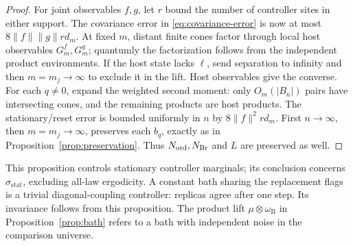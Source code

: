 \begin{proof}
For joint observables \(f,g\), let \(r\) bound the number of
controller sites in either support. The covariance error in
\eqref{eq:covariance-error} is now at most
\(8\|f\|\|g\|r d_m\). At fixed \(m\), distant finite cones
factor through local host observables \(G_m^f,G_m^g\);
quantumly the factorization follows from the independent
product environments. If the host state lacks \(\ell\), send
separation to infinity and then \(m=m_j\to\infty\) to exclude
it in the lift. Host observables give the converse.
For each \(q\ne0\), expand the weighted second moment:
only \(O_m(|B_n|)\) pairs have intersecting cones, and the
remaining products are host products. The stationary/reset
error is bounded uniformly in \(n\) by \(8\|f\|^2r d_m\).
First \(n\to\infty\), then \(m=m_j\to\infty\), preserves
each \(b_q\), exactly as in Proposition~\ref{prop:preservation}.
Thus \(N_{\mathrm{ord}},N_{\mathrm{Br}}\) and \(L\) are preserved as well.
\end{proof}

This proposition controls stationary controller marginals; its
conclusion concerns \(\sigma_{\mathrm{stat}}\), excluding
all-law ergodicity. A constant bath sharing the replacement
flags is a trivial diagonal-coupling controller: replicas agree
after one step. Its invariance follows from this proposition.
The product lift \(\mu\otimes\omega_{\mathrm B}\) in
Proposition~\ref{prop:bath} refers to a bath with independent
noise in the comparison universe.

